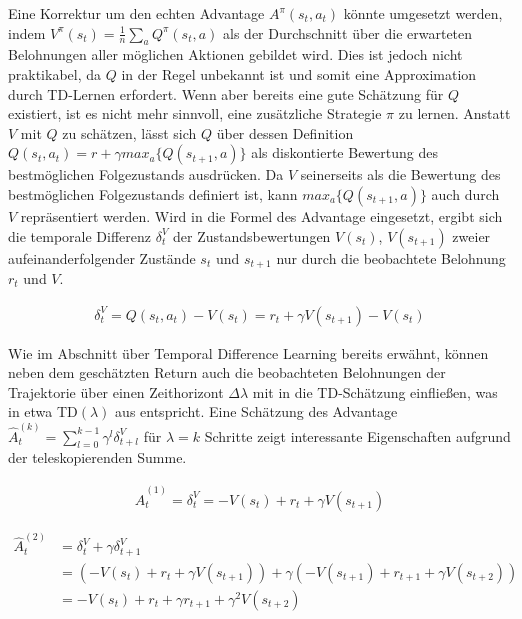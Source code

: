 Eine Korrektur um den echten Advantage $A^\pi(s_t, a_t)$ könnte umgesetzt werden,
indem $V^\pi(s_t) = \frac{1}{n} \sum_{a} Q^\pi(s_t, a)$ als der Durchschnitt über
die erwarteten Belohnungen aller möglichen Aktionen gebildet wird. Dies ist jedoch
nicht praktikabel, da $Q$ in der Regel unbekannt ist und somit eine Approximation durch
TD-Lernen erfordert. Wenn aber bereits eine gute Schätzung für $Q$
existiert, ist es nicht mehr sinnvoll, eine zusätzliche Strategie $\pi$ zu lernen.
Anstatt $V$ mit $Q$ zu schätzen, lässt sich $Q$ über dessen Definition
$Q(s_t, a_t) = r + \gamma max_a \{ Q(s_{t+1}, a) \}$ als diskontierte Bewertung
des bestmöglichen Folgezustands ausdrücken. Da $V$ seinerseits als die Bewertung
des bestmöglichen Folgezustands definiert ist, kann $max_a \{ Q(s_{t+1}, a) \}$ auch
durch $V$ repräsentiert werden. Wird in die Formel des Advantage eingesetzt, ergibt sich
die temporale Differenz $\delta_t^V$ der Zustandsbewertungen $V(s_t)$, $V(s_{t+1})$
zweier aufeinanderfolgender Zustände $s_t$ und $s_{t+1}$ nur durch die beobachtete
Belohnung $r_t$ und $V$.

\begin{equation}
\begin{aligned}
\delta_t^V = Q(s_t, a_t) - V(s_t) = r_t + \gamma V(s_{t+1}) - V(s_t)
\end{aligned}
\end{equation}

Wie im Abschnitt über Temporal Difference Learning bereits erwähnt, können neben
dem geschätzten Return auch die beobachteten Belohnungen der Trajektorie über einen
Zeithorizont $\Delta \lambda$ mit in die TD-Schätzung einfließen, was in etwa TD$(\lambda)$
aus \cite{sutton1998rlintro} entspricht. Eine Schätzung des Advantage
$\hat{A}_t^{(k)} = \sum_{l = 0}^{k - 1} \gamma^l \delta_{t+l}^V$ für $\lambda = k$
Schritte zeigt interessante Eigenschaften aufgrund der teleskopierenden Summe.

\begin{equation}
\begin{aligned}
\hat{A}_t^{(1)} = \delta_{t}^V = - V(s_t) + r_t + \gamma V(s_{t+1})
\end{aligned}
\end{equation}

\begin{equation}
\begin{aligned}
\hat{A}_t^{(2)} &= \delta_{t}^V + \gamma \delta_{t+1}^V\\
&= (- V(s_t) + r_t + \gamma V(s_{t+1})) + \gamma (- V(s_{t+1}) + r_{t+1} + \gamma V(s_{t+2}))\\
&= - V(s_t) + r_t + \gamma r_{t+1} + \gamma^2 V(s_{t+2})
\end{aligned}
\end{equation}

